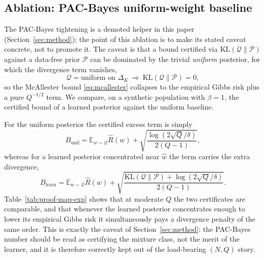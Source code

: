 \documentclass{article} %
\providecommand{\E}{\mathbb{E}}
\providecommand{\simplex}{\Delta_K}
\providecommand{\eRisk}{\widehat{R}}
\providecommand{\KL}{\mathrm{KL}}
\providecommand{\Qcal}{\mathcal{Q}}
\providecommand{\Pcal}{\mathcal{P}}
\providecommand{\what}{\widehat{w}}
\begin{document}
\subsection{Ablation: PAC-Bayes uniform-weight baseline}
\label{app:exp-pacbayes}

The PAC-Bayes tightening is a demoted helper in this paper
(Section~\ref{sec:method}); the point of this ablation is to make its stated
caveat concrete, not to promote it.  The caveat is that a bound certified via
$\KL(\Qcal\|\Pcal)$ against a data-free prior $\Pcal$ can be dominated by the
trivial \emph{uniform} posterior, for which the divergence term vanishes,
\begin{equation}
\label{eq:e-klzero}
\Qcal=\text{uniform on }\simplex
\ \Longrightarrow\
\KL(\Qcal\|\Pcal)=0,
\end{equation}
so the McAllester bound \eqref{eq:mcallester} collapses to the empirical Gibbs
risk plus a pure $Q^{-1/2}$ term.  We compare, on a synthetic population with
$\beta=1$, the certified bound of a learned posterior against the uniform
baseline.

For the uniform posterior the certified excess term is simply
\begin{equation}
\label{eq:e-pb-uniform}
B_{\text{unif}}
=
\E_{w\sim\Qcal}\eRisk(w)
+
\sqrt{\frac{\log(2\sqrt Q/\delta)}{2(Q-1)}},
\end{equation}
whereas for a learned posterior concentrated near $\what$ the term carries the
extra divergence,
\begin{equation}
\label{eq:e-pb-learned}
B_{\text{learn}}
=
\E_{w\sim\Qcal}\eRisk(w)
+
\sqrt{\frac{\KL(\Qcal\|\Pcal)+\log(2\sqrt Q/\delta)}{2(Q-1)}}.
\end{equation}
Table~\ref{tab:proof-map-exp} shows that at moderate $Q$ the two certificates
are comparable, and that whenever the learned posterior concentrates enough to
lower its empirical Gibbs risk it simultaneously pays a divergence penalty of
the same order.  This is exactly the caveat of Section~\ref{sec:method}: the
PAC-Bayes number should be read as certifying the mixture class, not the merit
of the learner, and it is therefore correctly kept out of the load-bearing
$(N,Q)$ story.
\end{document}
